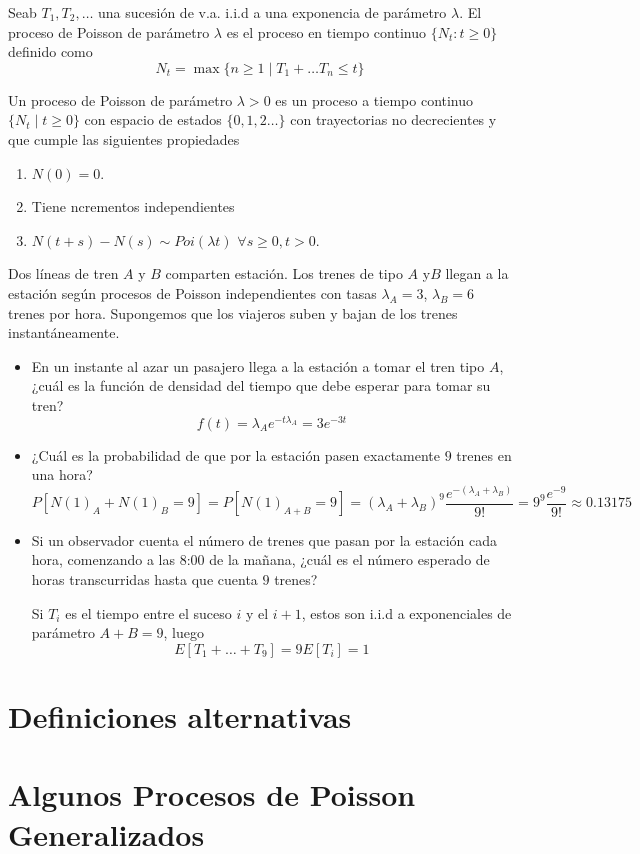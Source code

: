\documentclass[PREyA.tex]{subfiles}
\begin{document}
\begin{defi}
Seab $T_1,T_2,\dotsc$ una sucesión de v.a. i.i.d  a una exponencia de parámetro $\lambda$. El proceso de Poisson de parámetro $\lambda$ es el proceso en tiempo continuo $\{N_t:t\geq 0\}$ definido como 
$$
N_t = \max\{n\geq 1\mid T_1+\dotsc T_n \leq t\}
$$
\end{defi}
\begin{defi}
Un proceso de Poisson de parámetro $\lambda > 0$ es un proceso a tiempo continuo $\{N_t \mid t\geq0\}$ con espacio de estados $\{0,1,2\dotsc\}$ con trayectorias no decrecientes y que cumple las siguientes propiedades
\begin{enumerate}
\item $N(0)=0$.
\item Tiene ncrementos independientes
\item $N(t+s)-N(s) \sim Poi(\lambda t)$ $\forall s\geq 0, t>0$.
\end{enumerate}
\end{defi}
\begin{example}
Dos líneas de tren $A$ y $B$ comparten estación. Los trenes de tipo $A$ y$B$ llegan a la estación según procesos de Poisson independientes con tasas $\lambda_A =3$, $\lambda_B =6$ trenes por hora. Supongemos que los viajeros suben y bajan de los trenes instantáneamente.
\begin{itemize}
\item En un instante al azar un pasajero llega a la estación a tomar el tren tipo $A$, ¿cuál es la función de densidad del tiempo que debe esperar para tomar su tren?
$$
f(t) = \lambda_A e^{-t\lambda_A} = 3e^{-3t}
$$
\item ¿Cuál es la probabilidad de que por la estación pasen exactamente $9$ trenes en una hora?
$$
P[N(1)_A + N(1)_B = 9] = P[N(1)_{A+B} = 9] = (\lambda_A + \lambda_B)^9\frac{e^{-(\lambda_A+\lambda_B)}}{9!} = 9^9\frac{e^{-9}}{9!} \approx 0.13175
$$
\item Si un observador cuenta el número de trenes que pasan por la estación cada hora, comenzando a las 8:00 de la mañana, ¿cuál es el número esperado de horas transcurridas hasta que cuenta $9$ trenes?

Si $T_i$ es el tiempo entre el suceso $i$ y el $i+1$, estos son i.i.d a exponenciales de parámetro $A+B=9$, luego
$$
E[T_1 + \dotsc + T_9] = 9 E[T_i] = 1
$$
\end{itemize}
\end{example}
\section{Definiciones alternativas}
\section{Algunos Procesos de Poisson Generalizados}
\end{document}
